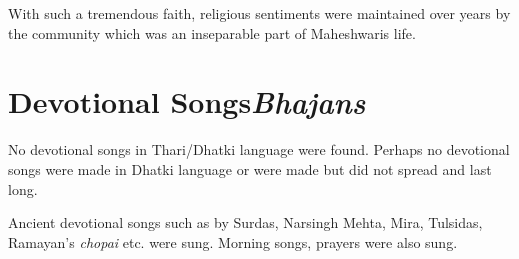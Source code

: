 With such a tremendous faith, religious sentiments were maintained over years
by the community which was an inseparable part of Maheshwaris life.

\section{Devotional Songs\textit{Bhajans}}
No devotional songs in Thari/Dhatki language were found. Perhaps no devotional
songs were made in Dhatki language or were made but did not spread and last
long.

Ancient devotional songs such as by Surdas, Narsingh Mehta, Mira, Tulsidas,
Ramayan's \textit{chopai} etc. were sung. Morning songs, prayers were also
sung.

